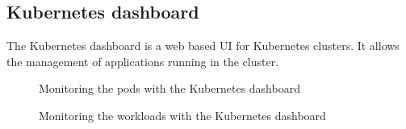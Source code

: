 \begin{appendices}
    \section{Kubernetes dashboard}
    The Kubernetes dashboard is a web based UI for Kubernetes clusters.
    It allows the management of applications running in the cluster.
    \begin{figure}[H]
        \centering
        \caption*{Monitoring the pods with the Kubernetes dashboard}
    \end{figure}
    \begin{figure}[H]
        \centering
        \caption*{Monitoring the workloads with the Kubernetes dashboard}
    \end{figure}
    \newpage
\end{appendices}
